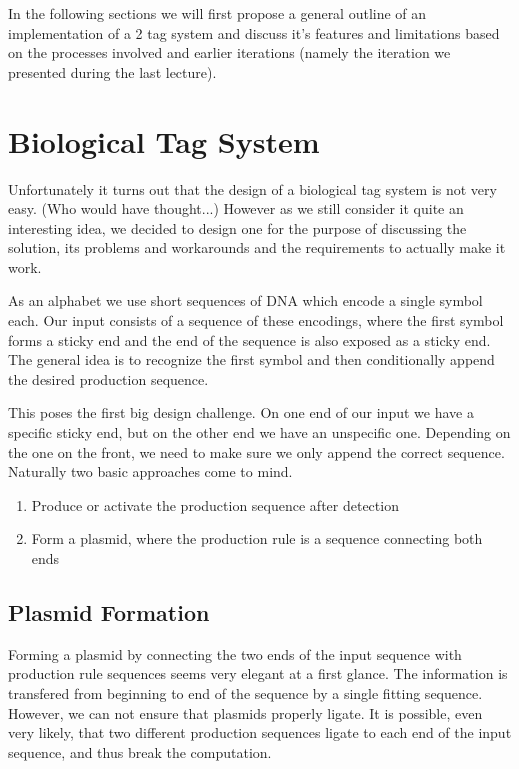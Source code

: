 \documentclass[
11pt, %
a4paper, %
oneside, %
headinclude,footinclude, %
BCOR5mm, %
]{scrartcl}
\begin{document}
In the following sections we will first propose a general outline of an
implementation of a 2 tag system and discuss it's features and limitations based
on the processes involved and earlier iterations (namely the iteration we
presented during the last lecture).

\section{Biological Tag System}

\begin{note}
  Unfortunately it turns out that the design of a biological tag system is not
  very easy. (Who would have thought...) However as we still consider it quite
  an interesting idea, we decided to design one for the purpose of discussing
  the solution, its problems and workarounds and the requirements to actually
  make it work.
\end{note}

As an alphabet we use short sequences of DNA which encode a single symbol each.
Our input consists of a sequence of these encodings, where the first symbol
forms a sticky end and the end of the sequence is also exposed as a sticky end.
The general idea is to recognize the first symbol and then conditionally append
the desired production sequence.

This poses the first big design challenge. On one end of our input we have a
specific sticky end, but on the other end we have an unspecific one. Depending
on the one on the front, we need to make sure we only append the correct
sequence. Naturally two basic approaches come to mind.

\begin{enumerate}
  \item Produce or activate the production sequence after detection
  \item Form a plasmid, where the production rule is a sequence connecting both
    ends
\end{enumerate}

\subsection{Plasmid Formation}

Forming a plasmid by connecting the two ends of the input sequence with
production rule sequences seems very elegant at a first glance. The information
is transfered from beginning to end of the sequence by a single fitting
sequence. However, we can not ensure that plasmids properly ligate. It is
possible, even very likely, that two different production sequences ligate to
each end of the input sequence, and thus break the computation.
\end{document}
